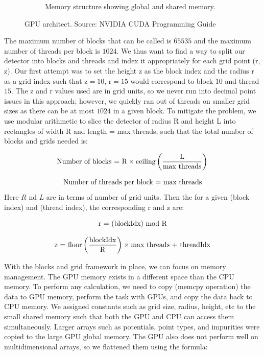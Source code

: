 \begin{figure}
\begin{subfigure}{0.48\textwidth}
 \caption{Memory structure showing global and shared memory.} \label{fig:GPU_basics_b}
 \end{subfigure}
\caption{GPU architect. Source: NVIDIA CUDA {\cpp}  Programming Guide} \label{fig:GPU_basics}
\end{figure}

The maximum number of blocks that can be called is $65535$ and the maximum number of threads per block is $1024$. We thus want to find a way to split our detector into blocks and threads and index it appropriately for each grid point (r, z). Our first attempt was to set the height z as the block index and the radius r as a grid index such that z$=10$, r$=15$ would correspond to block $10$ and thread $15$. The z and r values used are in grid units, so we never run into decimal point issues in this approach; however, we quickly ran out of threads on smaller grid sizes as there can be at most $1024$ in a given block. To mitigate the problem, we use modular arithmetic to slice the detector of radius R and height L into rectangles of width R and length = max threads, such that the total number of blocks and grids needed is:

\begin{equation}{\label{nu_b}}
 \text{Number of blocks = R}\times \text{ceiling} \left( \frac{\text{L}}{\text{max threads}} \right) \\
\end{equation}

\begin{equation}{\label{nu_g}}
 \text{Number of threads per block = max threads}
\end{equation}
Here $R$ nd $L$ are in terms of number of grid units. Then the for a given (block index) and (thread index), the corresponding r and z are:

\begin{equation}{\label{r_eq}}
 \text{r = (blockIdx) mod R} \\
\end{equation}

\begin{equation}{\label{z_eq}}
 \text{z = floor}\left(\frac{\text{blockIdx}}{\text{R}}\right) \times \text{max threads + threadIdx}
\end{equation}

With the blocks and grid framework in place, we can focus on memory management. The GPU memory exists in a different space than the CPU memory. To perform any calculation, we need to copy (memcpy operation) the data to GPU memory, perform the task with GPUs, and copy the data back to CPU memory. We assigned constants such as grid size, radius, height, etc to the small shared memory such that both the GPU and CPU can access them simultaneously. Larger arrays such as potentials, point types, and impurities were copied to the large GPU global memory. The GPU also does not perform well on multidimensional arrays, so we flattened them using the formula:


